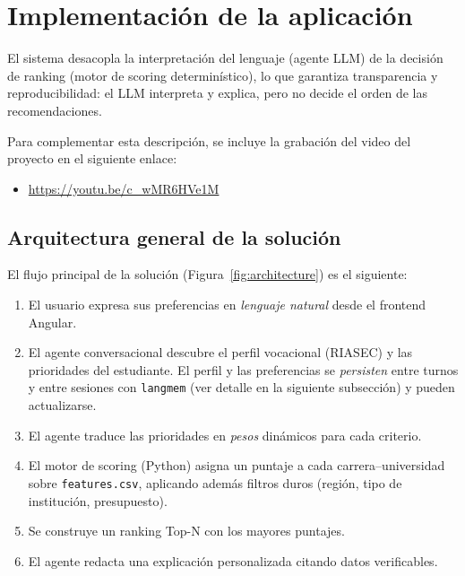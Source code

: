 \section{Implementaci\'on de la aplicaci\'on}
\label{sec:implementation}

El sistema desacopla la interpretaci\'on del lenguaje (agente LLM) de la
decisi\'on de ranking (motor de scoring determin\'istico), lo que garantiza
transparencia y reproducibilidad: el LLM interpreta y explica, pero no decide el
orden de las recomendaciones.

Para complementar esta descripci\'on, se incluye la grabaci\'on del video del
proyecto en el siguiente enlace:
\begin{itemize}[noitemsep]
  \item \url{https://youtu.be/c_wMR6HVe1M}
\end{itemize}

\subsection{Arquitectura general de la soluci\'on}

El flujo principal de la soluci\'on (Figura~\ref{fig:architecture}) es el siguiente:

\begin{enumerate}[noitemsep]
  \item El usuario expresa sus preferencias en \emph{lenguaje natural} desde el
        frontend Angular.
  \item El agente conversacional descubre el perfil vocacional (RIASEC) y las
        prioridades del estudiante. El perfil y las preferencias se
        \emph{persisten} entre turnos y entre sesiones con \texttt{langmem}
        (ver detalle en la siguiente subsecci\'on) y pueden actualizarse.
  \item El agente traduce las prioridades en \emph{pesos} din\'amicos para cada
        criterio.
  \item El motor de scoring (Python) asigna un puntaje a cada
        carrera--universidad sobre \texttt{features.csv}, aplicando adem\'as
        filtros duros (regi\'on, tipo de instituci\'on, presupuesto).
  \item Se construye un ranking Top-N con los mayores puntajes.
  \item El agente redacta una explicaci\'on personalizada citando datos
        verificables.
\end{enumerate}


